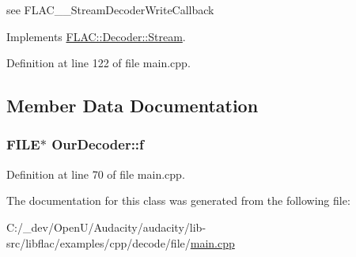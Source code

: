 see F\+L\+A\+C\+\_\+\+\_\+\+Stream\+Decoder\+Write\+Callback 



Implements \hyperlink{class_f_l_a_c_1_1_decoder_1_1_stream_af5a61e9ff720cca3eb38d1f2790f00fb}{F\+L\+A\+C\+::\+Decoder\+::\+Stream}.



Definition at line 122 of file main.\+cpp.



\subsection{Member Data Documentation}
\subsubsection[{\texorpdfstring{f}{f}}]{\setlength{\rightskip}{0pt plus 5cm}F\+I\+LE$\ast$ Our\+Decoder\+::f\hspace{0.3cm}{\ttfamily [protected]}}\hypertarget{class_our_decoder_a13222ae563d6584722c9cb42a0fa999e}{}\label{class_our_decoder_a13222ae563d6584722c9cb42a0fa999e}


Definition at line 70 of file main.\+cpp.



The documentation for this class was generated from the following file\+:\begin{DoxyCompactItemize}
\item 
C\+:/\+\_\+dev/\+Open\+U/\+Audacity/audacity/lib-\/src/libflac/examples/cpp/decode/file/\hyperlink{lib-src_2libflac_2examples_2cpp_2decode_2file_2main_8cpp}{main.\+cpp}\end{DoxyCompactItemize}
